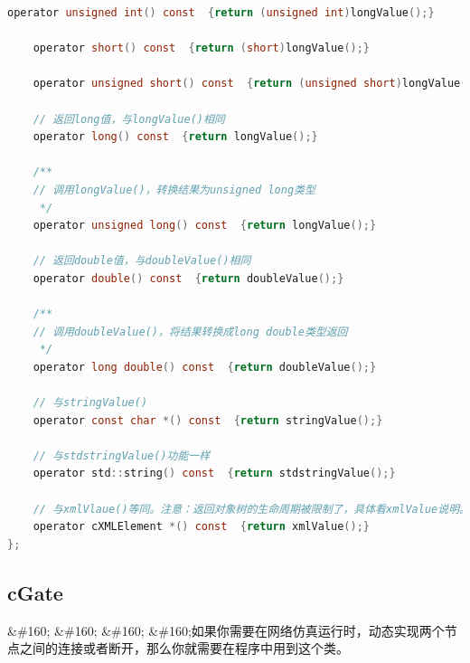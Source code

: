 \begin{lstlisting}[language=c]
    operator unsigned int() const  {return (unsigned int)longValue();}

    operator short() const  {return (short)longValue();}

    operator unsigned short() const  {return (unsigned short)longValue();}

    // 返回long值，与longValue()相同
    operator long() const  {return longValue();}

    /**
    // 调用longValue()，转换结果为unsigned long类型
     */
    operator unsigned long() const  {return longValue();}

    // 返回double值，与doubleValue()相同
    operator double() const  {return doubleValue();}

    /**
    // 调用doubleValue()，将结果转换成long double类型返回
     */
    operator long double() const  {return doubleValue();}

    // 与stringValue()
    operator const char *() const  {return stringValue();}

    // 与stdstringValue()功能一样
    operator std::string() const  {return stdstringValue();}

    // 与xmlVlaue()等同。注意：返回对象树的生命周期被限制了，具体看xmlValue说明。
    operator cXMLElement *() const  {return xmlValue();}
};
\end{lstlisting}

\subsection{cGate}
\label{cgate}

\&\#160; \&\#160; \&\#160; \&\#160;如果你需要在网络仿真运行时，动态实现两个节点之间的连接或者断开，那么你就需要在程序中用到这个类。

